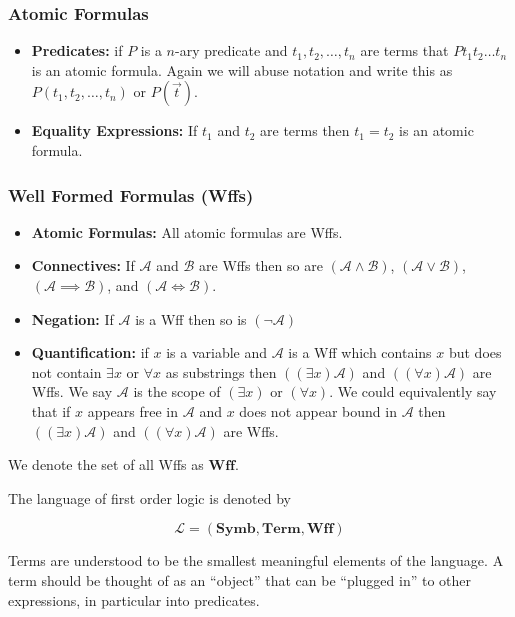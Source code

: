 \documentclass[12pt]{article}
\newcommand{\bv}[1]{\boldsymbol{#1}}
\newcommand{\mc}[1]{\mathcal{#1}}
\newcommand{\bc}[1]{\bv{\mc{#1}}}
\begin{document}
\hrulefill
\subsubsection*{Atomic Formulas}
\begin{itemize}
\item{\textbf{Predicates:} if $P$ is a $n$-ary predicate and $t_1,t_2,\ldots,t_n$ are terms that $Pt_1t_2\ldots t_n$ is an atomic formula. Again we will abuse notation and write this as $P(t_1,t_2,\ldots,t_n)$ or $P(\vec{t})$.}
\item{\textbf{Equality Expressions:} If $t_1$ and $t_2$ are terms then $t_1=t_2$ is an atomic formula.}
\end{itemize}
\hrulefill
\subsubsection*{Well Formed Formulas (Wffs)}
\begin{itemize}
\item{\textbf{Atomic Formulas:} All atomic formulas are Wffs.}
\item{\textbf{Connectives:} If $\mc{A}$ and $\mc{B}$ are Wffs then so are $(\mc{A}\land\mc{B})$, $(\mc{A} \lor \mc{B})$, $(\mc{A}\implies\mc{B})$, and $(\mc{A}\iff\mc{B})$.}
\item{\textbf{Negation:} If $\mc{A}$ is a Wff then so is $(\lnot\mc{A})$}
\item{\textbf{Quantification:} if $x$ is a variable and $\mc{A}$ is a Wff which contains $x$ but does not contain $\exists x$ or $\forall x$ as substrings then $((\exists x)\mc{A})$ and $((\forall x)\mathcal{A})$ are Wffs. We say $\mc{A}$ is the scope of $(\exists x)$ or $(\forall x)$. We could equivalently say that if $x$ appears free in $\mc{A}$ and $x$ does not appear bound in $\mc{A}$ then $((\exists x)\mc{A})$ and $((\forall x)\mc{A})$ are Wffs.}
\end{itemize}

We denote the set of all Wffs as $\mathbf{Wff}$.

\hrulefill

The language of first order logic is denoted by

\begin{equation}
\bc{L} = (\mathbf{Symb},\mathbf{Term},\mathbf{Wff})
\end{equation}

Terms are understood to be the smallest meaningful elements of the language. A term should be thought of as an ``object'' that can be ``plugged in'' to other expressions, in particular into predicates. 
\end{document}
